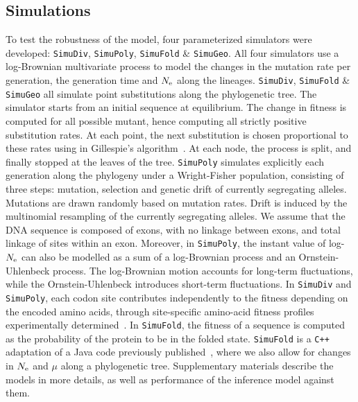 \documentclass{article}
\begin{document}
    \subsection{Simulations}
    \label{sec:Simulation}
    To test the robustness of the model, four parameterized simulators were developed: \texttt{SimuDiv}, \texttt{SimuPoly}, \texttt{SimuFold} \& \texttt{SimuGeo}.
    All four simulators use a log-Brownian multivariate process to model the changes in the mutation rate per generation, the generation time and $N_{\text{e}}$ along the lineages.
    \texttt{SimuDiv}, \texttt{SimuFold} \& \texttt{SimuGeo} all simulate point substitutions along the phylogenetic tree.
    The simulator starts from an initial sequence at equilibrium.
    The change in fitness is computed for all possible mutant, hence computing all strictly positive {substitution} rates.
    At each point, the next {substitution} is chosen proportional to these rates using in Gillespie's algorithm~\citep{Gillespie1977}.
    At each node, the process is split, and finally stopped at the leaves of the tree.
    \texttt{SimuPoly} simulates explicitly each generation along the phylogeny under a Wright-Fisher population, consisting of three steps: mutation, selection and {genetic drift} of currently segregating alleles.
    Mutations are drawn randomly based on mutation rates.
    Drift is induced by the multinomial resampling of the currently segregating alleles.
    We assume that the {DNA} sequence is composed of exons, with no linkage between exons, and total linkage of sites within an exon.
    Moreover, in \texttt{SimuPoly}, the instant value of log-$N_{\text{e}}$ can also be modelled as a sum of a log-Brownian process and an Ornstein-Uhlenbeck process.
    The log-Brownian motion accounts for long-term fluctuations, while the Ornstein-Uhlenbeck introduces short-term fluctuations.
    In \texttt{SimuDiv} and \texttt{SimuPoly}, each {codon} site contributes independently to the fitness depending on the encoded amino acids, through site-specific amino-acid fitness profiles experimentally determined~\citep{Bloom2017}.
    In \texttt{SimuFold}, the fitness of a sequence is computed as the probability of the protein to be in the folded state.
    \texttt{SimuFold} is a \texttt{C++} adaptation of a Java code previously published~\citep{Goldstein2016, Goldstein2017}, where we also allow for changes in $N_{\text{e}}$ and $\mu$ along a phylogenetic tree.
    Supplementary materials describe the models in more details, as well as performance of the inference model against them.
\end{document}
